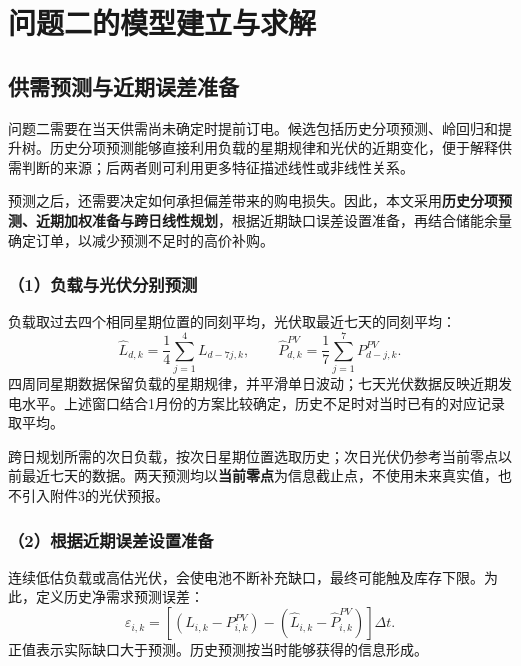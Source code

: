 \section{问题二的模型建立与求解}
\subsection{供需预测与近期误差准备}
问题二需要在当天供需尚未确定时提前订电。候选包括历史分项预测、岭回归和提升树。历史分项预测能够直接利用负载的星期规律和光伏的近期变化，便于解释供需判断的来源；后两者则可利用更多特征描述线性或非线性关系。

预测之后，还需要决定如何承担偏差带来的购电损失。因此，本文采用\textbf{历史分项预测、近期加权准备与跨日线性规划}，根据近期缺口误差设置准备，再结合储能余量确定订单，以减少预测不足时的高价补购。

\subsubsection*{（1）负载与光伏分别预测}
负载取过去四个相同星期位置的同刻平均，光伏取最近七天的同刻平均：
\begin{equation}
\widehat L_{d,k}=\frac14\sum_{j=1}^{4}L_{d-7j,k},\qquad
\widehat P^{PV}_{d,k}=\frac17\sum_{j=1}^{7}P^{PV}_{d-j,k}.
\label{eq:q2_forecast}
\end{equation}
四周同星期数据保留负载的星期规律，并平滑单日波动；七天光伏数据反映近期发电水平。上述窗口结合1月份的方案比较确定，历史不足时对当时已有的对应记录取平均。

跨日规划所需的次日负载，按次日星期位置选取历史；次日光伏仍参考当前零点以前最近七天的数据。两天预测均以\textbf{当前零点}为信息截止点，不使用未来真实值，也不引入附件3的光伏预报。

\subsubsection*{（2）根据近期误差设置准备}
连续低估负载或高估光伏，会使电池不断补充缺口，最终可能触及库存下限。为此，定义历史净需求预测误差：
\begin{equation}
\varepsilon_{i,k}=\left[(L_{i,k}-P^{PV}_{i,k})-(\widehat L_{i,k}-\widehat P^{PV}_{i,k})\right]\Delta t.
\label{eq:q2_error}
\end{equation}
正值表示实际缺口大于预测。历史预测按当时能够获得的信息形成。

